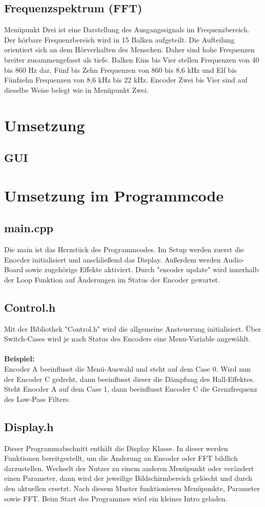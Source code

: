 \documentclass[12pt]{article}
\begin{document}
\subsection{Frequenzspektrum (FFT)}
Menüpunkt Drei ist eine Darstellung des Ausgangssignals im Frequenzbereich. 
Der hörbare Frequenzbereich wird in 15 Balken aufgeteilt. Die Aufteilung orientiert sich an dem Hörverhalten des Menschen. 
Daher sind hohe Frequenzen breiter zusammengefasst als tiefe. 
Balken Eins bis Vier stellen Frequenzen von 40 bis 860 Hz dar, Fünf bis Zehn Frequenzen von 860 bis 8,6 kHz und Elf bis Fünfzehn Frequenzen von 8,6 kHz bis 22 kHz.
Encoder Zwei bis Vier sind auf dieselbe Weise belegt wie in Menüpunkt Zwei.
\section{Umsetzung}
\subsection{GUI}
\newpage
\section{Umsetzung im Programmcode}
\subsection{main.cpp}
Die main ist das Herzstück des Programmcodes. Im Setup werden zuerst die Enocder initialisiert und anschließend das Display. 
Außerdem werden Audio-Board sowie zugehörige Effekte aktiviert. 
Durch "encoder update" wird innerhalb der Loop Funktion auf Änderungen im Status der Encoder gewartet.
\subsection{Control.h}
Mit der Bibliothek "Control.h" wird die allgemeine Ansteuerung initialisiert. Über Switch-Cases wird je nach Status des Encoders eine Menu-Variable angewählt. 
\\
\\
\textbf{Beispiel:}
\\
Encoder A beeinflusst die Menü-Auswahl und steht auf dem Case 0. Wird nun der Encoder C gedreht, dann beeinflusst dieser die Dämpfung des Hall-Effektes.
Steht Enocder A auf dem Case 1, dann beeinflusst Encoder C die Grenzfrequenz des Low-Pass Filters.
\subsection{Display.h}
Dieser Programmabschnitt enthält die Display Klasse. In dieser werden Funktionen bereitgestellt, um die Änderung an Encoder oder FFT bildlich darzustellen.  
Wechselt der Nutzer zu einem anderen Menüpunkt oder verändert einen Parameter, dann wird der jeweilige Bildschirmbereich gelöscht und durch den aktuellen ersetzt. 
Nach diesem Muster funktionieren Menüpunkte, Parameter sowie FFT. Beim Start des Programmes wird ein kleines Intro geladen.
\end{document}

